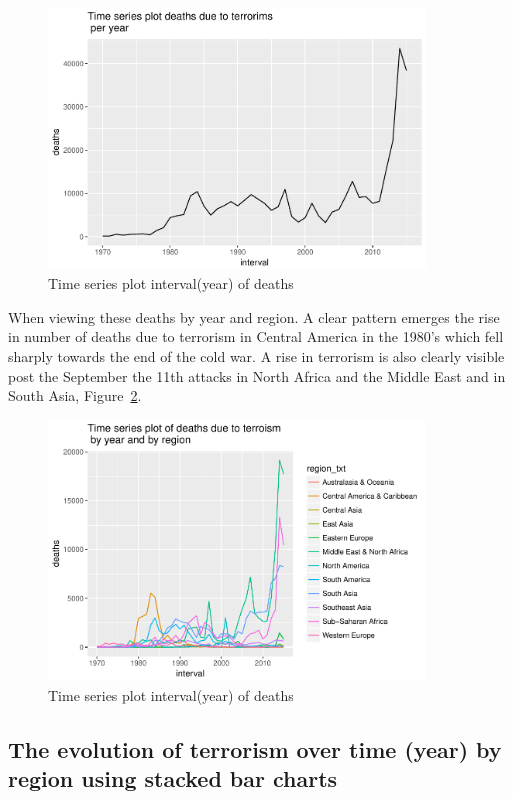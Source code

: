 \begin{figure}[t]
\includegraphics[width=10cm]{Peters_experiment_markdown_files/figure-latex/unnamed-chunk-4-1.pdf}
\caption{Time series plot interval(year) of deaths}
\label{fig:tseriesyear1}
\centering
\end{figure}

When viewing these deaths by  year and region. A clear pattern emerges the rise in number of deaths due to terrorism in Central America in the 1980's which fell
sharply towards the end of the cold war. A rise in terrorism is also clearly visible post the September the 11th attacks in North Africa and the Middle East and in South Asia, Figure~\ref{fig:tseriesyear2}.

\begin{figure}[t]
\includegraphics[width=10cm]{Peters_experiment_markdown_files/figure-latex/unnamed-chunk-5-1.pdf}
\caption{Time series plot interval(year) of deaths}
\label{fig:tseriesyear2}
\centering
\end{figure}

\subsection{The evolution of terrorism over time (year) by
region using stacked bar charts}

